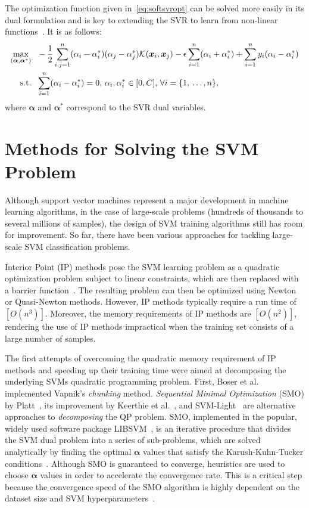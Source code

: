 \documentclass[reqno]{vcuthesis}
\newcommand{\set}[1]{{\left\{#1\right\}}}
\numberwithin{equation}{chapter}
\begin{document}
The optimization function given in~\ref{eq:softsvropt} can be solved more easily in its dual formulation and is key to extending the SVR to learn from non-linear functions~\cite{Schoelkopf2002}. It is as follows:
\begin{equation}
\label{eq:dualSVR}
\centering
\begin{aligned}
\max\limits_{(\bm \alpha, \bm \alpha^*)} & {\,\,\,\,} -\frac{1}{2} \sum_{i,j = 1}^n (\alpha_i - \alpha^*_i)(\alpha_j - \alpha^*_j)\mathcal{K}(\bm x_i, \bm x_j)  - \epsilon \sum_{i=1}^n (\alpha_i + \alpha^*_i) + \sum_{i=1}^n y_i (\alpha_i - \alpha^*_i) \\
 \text{s.t.} & {\,\,\,\,} \sum_{i=1}^n (\alpha_i - \alpha^*_i) = 0,\, \alpha_i, \alpha^*_i \in [0, C],\, \forall i = \set{1,\,\ldots,n},
 \end{aligned}
\end{equation}
where $\bm \alpha$ and $\bm \alpha^*$ correspond to the SVR dual variables.  

\section{Methods for Solving the SVM Problem}
Although support vector machines represent a major development in machine learning algorithms, in the case of large-scale problems (hundreds of thousands to several millions of samples), the design of SVM training algorithms still has room for improvement. So far, there have been various approaches for tackling large-scale SVM classification problems.

Interior Point (IP) methods pose the SVM learning problem as a quadratic optimization problem subject to linear constraints, which are then replaced with a barrier function~\cite{Boyd2004}. The resulting problem can then be optimized using Newton or Quasi-Newton methods. However, IP methods typically require a run time of $[O(n^3)]$. Moreover, the memory requirements of IP methods are $[O(n^2)]$, rendering the use of IP methods impractical when the training set consists of a large number of samples. 

The first attempts of overcoming the quadratic memory requirement of IP methods and speeding up their training time were aimed at decomposing the underlying SVMs quadratic programming problem. First, Boser et al.~\cite{boser1992training} implemented Vapnik's \textit{chunking} method. \textit{Sequential Minimal Optimization} (SMO) by Platt~\cite{Platt1998}, its improvement by Keerthie et al.~\cite{keerthi2001improvements}, and SVM-Light~\cite{Joachims1999} are alternative approaches to \textit{decomposing} the QP problem. SMO, implemented in the popular, widely used software package LIBSVM~\cite{CC01a}, is an iterative procedure that divides the SVM dual problem into a series of sub-problems, which are solved analytically by finding the optimal $\bm \alpha$ values that satisfy the Karush-Kuhn-Tucker conditions~\cite{Boyd2004}. Although SMO is guaranteed to converge, heuristics are used to choose $\bm \alpha$ values in order to accelerate the convergence rate. This is a critical step because the convergence speed of the SMO algorithm is highly dependent on the dataset size and SVM hyperparameters~\cite{Schoelkopf2002}. 
\end{document}
